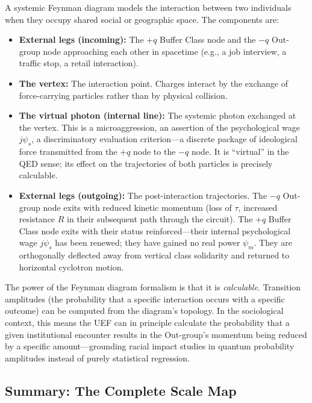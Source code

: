 \begin{definition}
A systemic Feynman diagram models the interaction between two individuals when they occupy shared social or geographic space. The components are:
\begin{itemize}
\item \textbf{External legs (incoming):} The $+q$ Buffer Class node and the $-q$ Out-group node approaching each other in spacetime (e.g., a job interview, a traffic stop, a retail interaction).
\item \textbf{The vertex:} The interaction point. Charges interact by the exchange of force-carrying particles rather than by physical collision.
\item \textbf{The virtual photon (internal line):} The systemic photon exchanged at the vertex. This is a microaggression, an assertion of the psychological wage $j\psi_s$, a discriminatory evaluation criterion---a discrete package of ideological force transmitted from the $+q$ node to the $-q$ node. It is ``virtual'' in the QED sense; its effect on the trajectories of both particles is precisely calculable.
\item \textbf{External legs (outgoing):} The post-interaction trajectories. The $-q$ Out-group node exits with reduced kinetic momentum (loss of $\tau$, increased resistance $R$ in their subsequent path through the circuit). The $+q$ Buffer Class node exits with their status reinforced---their internal psychological wage $j\psi_s$ has been renewed; they have gained no real power $\psi_m$. They are orthogonally deflected away from vertical class solidarity and returned to horizontal cyclotron motion.
\end{itemize}
\end{definition}

The power of the Feynman diagram formalism is that it is \emph{calculable}. Transition amplitudes (the probability that a specific interaction occurs with a specific outcome) can be computed from the diagram's topology. In the sociological context, this means the UEF can in principle calculate the probability that a given institutional encounter results in the Out-group's momentum being reduced by a specific amount---grounding racial impact studies in quantum probability amplitudes instead of purely statistical regression.

\subsection{Summary: The Complete Scale Map}

